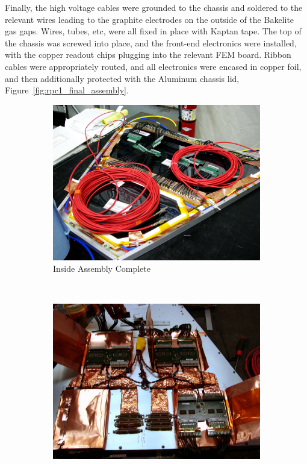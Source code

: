Finally, the high voltage cables were grounded to the chassis and soldered to
the relevant wires leading to the graphite electrodes on the outside of the
Bakelite gas gaps. Wires, tubes, etc, were all fixed in place with Kaptan tape.
The top of the chassis was screwed into place, and the front-end electronics
were installed, with the copper readout chips plugging into the relevant FEM
board.  Ribbon cables were appropriately routed, and all electronics were
encased in copper foil, and then additionally protected with the Aluminum
chassis lid, Figure~\ref{fig:rpc1_final_assembly}.

\begin{figure}
  \centering
  \begin{subfigure}[b]{0.5\textwidth}
    \centering
    \includegraphics[width=\linewidth]{./figures/rpc1_construction_7}
    \caption{Inside Assembly Complete}
    \label{fig:rpc1_assembled}
  \end{subfigure}%
  ~
  \begin{subfigure}[b]{0.5\textwidth}
    \centering
    \includegraphics[width=\linewidth]{./figures/rpc1_construction_8}

\end{subfigure}
\end{figure}
